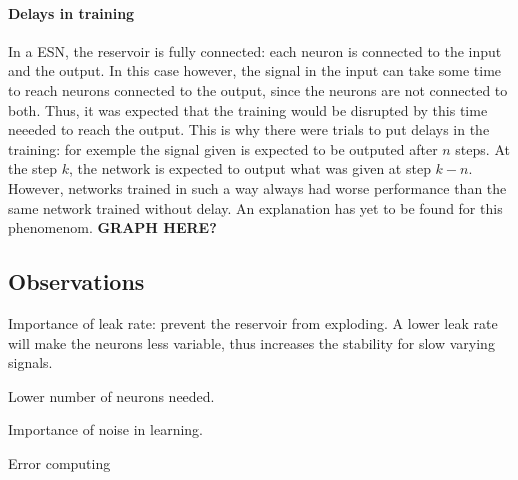 \documentclass[11pt]{article}
\begin{document}
    \paragraph{Delays in training}
      In a ESN, the reservoir is fully connected: each neuron is connected to the input and the output. In this case however, the signal in the input can take some time to reach neurons connected to the output, since the neurons are not connected  to both. Thus, it was expected that the training would be disrupted by this time neeeded to reach the output. This is why there were trials to put delays in the training: for exemple the signal given is expected to be outputed after $n$ steps. At the step $k$, the network is expected to output what was given at step $k-n$. However, networks trained in such a way always had worse performance than the same network trained without delay. An explanation has yet to be found for this phenomenom. \textbf{GRAPH HERE?}

  \subsection{Observations}
    Importance of leak rate: prevent the reservoir from exploding. A lower leak rate will make the neurons less variable, thus increases the stability for slow varying signals.

    Lower number of neurons needed.

    Importance of noise in learning.

    Error computing



\end{document}
